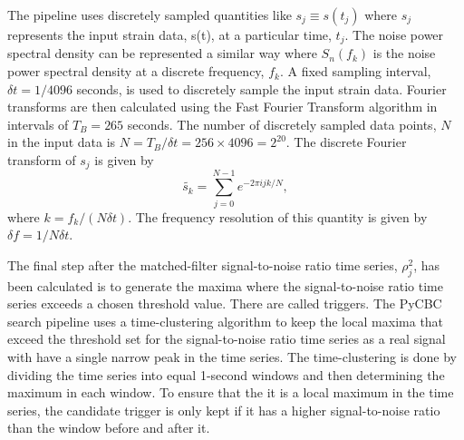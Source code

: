 The pipeline uses discretely sampled quantities like $s_j \equiv s(t_j)$ where $s_j$ represents the input strain data, s(t), at a particular time, $t_j$. The noise power spectral density can be represented a similar way where $S_n(f_k)$ is the noise power spectral density at a discrete frequency, $f_k$. A fixed sampling interval, $\delta t = 1/4096$ seconds, is used to discretely sample the input strain data. Fourier transforms are then calculated using the Fast Fourier Transform algorithm in intervals of $T_B = 265$ seconds. The number of discretely sampled data points, $N$ in the input data is $N = T_B/\delta t = 256 \times 4096 = 2^{20}$. The discrete Fourier transform of $s_j$ is given by
\begin{equation}
    \tilde{s_k} = \sum_{j=0}^{N-1}e^{-2\pi ijk/N},
\end{equation}
where $k=f_k/(N\delta t)$. The frequency resolution of this quantity is given by $\delta f = 1/N\delta t$.

The final step after the matched-filter signal-to-noise ratio time series, $\rho_j^2$, has been calculated is to generate the maxima where the signal-to-noise ratio time series exceeds a chosen threshold value. There are called triggers. The PyCBC search pipeline uses a time-clustering algorithm to keep the local maxima that exceed the threshold set for the signal-to-noise ratio time series as a real signal with have a single narrow peak in the time series. The time-clustering is done by dividing the time series into equal 1-second windows and then determining the maximum in each window. To ensure that the it is a local maximum in the time series, the candidate trigger is only kept if it has a higher signal-to-noise ratio than the window before and after it.


